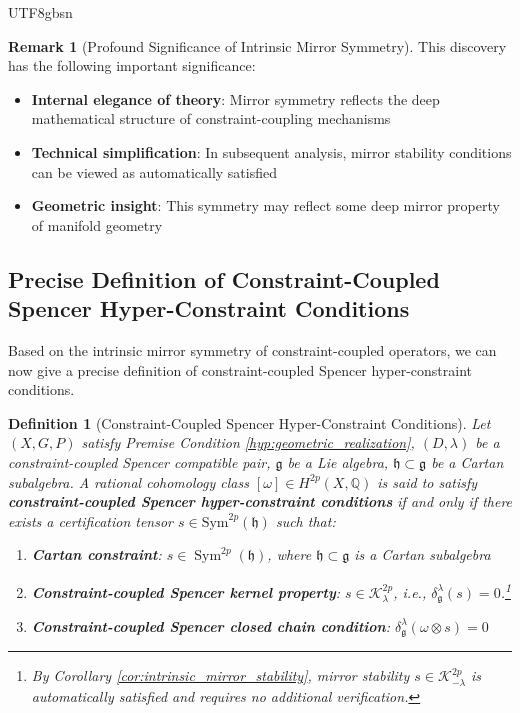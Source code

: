 \documentclass[a4paper,12pt]{extarticle}
\newtheorem{definition}[theorem]{Definition}
\theoremstyle{definition}
\newtheorem{remark}{Remark}[section]
\begin{document}
\begin{CJK}{UTF8}{gbsn}
\begin{remark}[Profound Significance of Intrinsic Mirror Symmetry]
This discovery has the following important significance:
\begin{itemize}
    \item \textbf{Internal elegance of theory}: Mirror symmetry reflects the deep mathematical structure of constraint-coupling mechanisms
    \item \textbf{Technical simplification}: In subsequent analysis, mirror stability conditions can be viewed as automatically satisfied
    \item \textbf{Geometric insight}: This symmetry may reflect some deep mirror property of manifold geometry
\end{itemize}
\end{remark}

\subsection{Precise Definition of Constraint-Coupled Spencer Hyper-Constraint Conditions}
\label{subsec:constraint_spencer_superconstraints}

Based on the intrinsic mirror symmetry of constraint-coupled operators, we can now give a precise definition of constraint-coupled Spencer hyper-constraint conditions.

\begin{definition}[Constraint-Coupled Spencer Hyper-Constraint Conditions]
\label{def:constraint_spencer_superconstraint}
Let $(X, G, P)$ satisfy Premise Condition \ref{hyp:geometric_realization}, $(D, \lambda)$ be a constraint-coupled Spencer compatible pair, $\mathfrak{g}$ be a Lie algebra, $\mathfrak{h} \subset \mathfrak{g}$ be a Cartan subalgebra. A rational cohomology class $[\omega] \in H^{2p}(X, \mathbb{Q})$ is said to satisfy \textbf{constraint-coupled Spencer hyper-constraint conditions} if and only if there exists a certification tensor $s \in \text{Sym}^{2p}(\mathfrak{h})$ such that:

\begin{enumerate}
    \item \textbf{Cartan constraint}: $s \in \operatorname{Sym}^{2p}(\mathfrak{h})$, where $\mathfrak{h} \subset \mathfrak{g}$ is a Cartan subalgebra
    \item \textbf{Constraint-coupled Spencer kernel property}: $s \in \mathcal{K}^{2p}_\lambda$, i.e., $\delta^\lambda_\mathfrak{g}(s) = 0$.\footnote{By Corollary \ref{cor:intrinsic_mirror_stability}, mirror stability $s \in \mathcal{K}^{2p}_{-\lambda}$ is automatically satisfied and requires no additional verification.}
    \item \textbf{Constraint-coupled Spencer closed chain condition}: $\delta^\lambda_\mathfrak{g}(\omega \otimes s) = 0$
\end{enumerate}
\end{definition}


\end{CJK}
\end{document}
